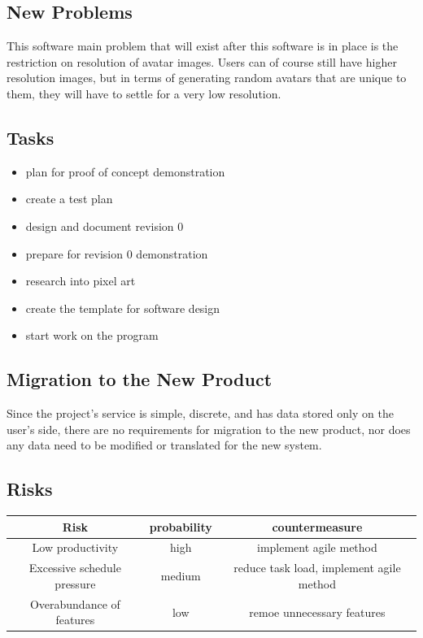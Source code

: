 \documentclass[12pt, titlepage]{article}
\begin{document}
\subsection{New Problems}
This software main problem that will exist after this software is in place is the restriction on resolution of avatar images. Users can of course still have higher resolution images, but in terms of generating random avatars that are unique to them, they will have to settle for a very low resolution.

\subsection{Tasks}
\begin{itemize}
  \item plan for proof of concept demonstration
  \item create a test plan
  \item design and document revision 0
  \item prepare for revision 0 demonstration
  \item research into pixel art
  \item create the template for software design
  \item start work on the program
\end{itemize}

\subsection{Migration to the New Product}
Since the project's service is simple, discrete, and has data stored only on the
user's side, there are no requirements for migration to the new product, nor does
any data need to be modified or translated for the new system.

\subsection{Risks}
\begin{tabular}{| c | c | c |}
  \hline
  Risk & probability & countermeasure \\
  \hline
  Low productivity & high & implement agile method \\
  \hline
  Excessive schedule pressure & medium & reduce task load, implement agile method \\
  \hline
  Overabundance of features & low & remoe unnecessary features \\
  \hline
\end{tabular}
\end{document}
